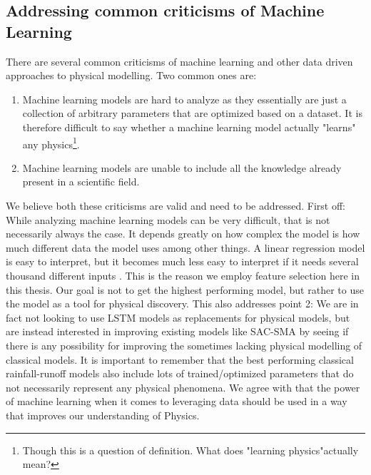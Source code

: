 \subsection{Addressing common criticisms of Machine Learning}
There are several common criticisms of machine learning and other data driven 
approaches to physical modelling. Two common ones are:
\begin{enumerate}
    \item Machine learning models are hard to analyze as they essentially are just a collection of arbitrary parameters that are optimized based on a dataset. It is therefore difficult to say whether a machine learning model actually "learns" any physics\footnote{Though this is a question of definition. What does "learning physics"actually mean?}.
    \item Machine learning models are unable to include all the knowledge already present in a scientific field.
\end{enumerate}
We believe both these criticisms are valid and need to be addressed. First off: 
While analyzing machine learning models can be very difficult, that is not necessarily 
always the case. It depends greatly on how complex the model is how much different 
data the model uses among other things. A linear regression model is easy to interpret, 
but it becomes much less easy to interpret if it needs several thousand different 
inputs \cite{elemstatlearn}. This is the reason we employ feature selection here 
in this thesis. Our goal is not to get the highest performing model, but rather 
to use the model as a tool for physical discovery. This also addresses point 2: 
We  are in fact not looking to use LSTM models as replacements for physical models, 
but are instead interested in improving existing models like SAC-SMA \citationneeded 
by seeing if there is any possibility for improving the sometimes lacking physical 
modelling of classical models. It is important to remember that the best performing 
classical rainfall-runoff models also include lots of trained/optimized parameters 
that do not necessarily represent any physical phenomena. We agree with \cite{hybrid_paper} 
that the power of machine learning when it comes to leveraging data should be 
used in a way that improves our understanding of Physics.
